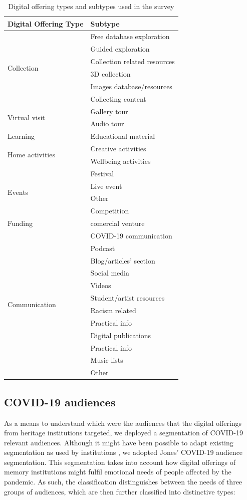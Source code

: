 \documentclass{egpubl}
\begin{document}
\begin{table}
\begin{tabular}
{ | l | l | }
    \hline
    \textbf{Digital Offering Type}  & \textbf{Subtype}  \\
    \hline
  \multirow{6}{*}{Collection} & Free database exploration  \\
&  Guided exploration  \\
&  Collection related resources \\
&  3D collection \\
&  Images database/resources \\
&  Collecting content \\
    \hline
 \multirow{2}{*}{Virtual visit} & Gallery tour  \\
&  Audio tour  \\
    \hline
 Learning & Educational material  \\
    \hline
 \multirow{2}{*}{Home activities} & Creative activities \\
&  Wellbeing activities  \\
    \hline
 \multirow{4}{*}{Events} & Festival\\
&  Live event \\
&  Other \\
&  Competition \\
    \hline
 Funding & comercial venture \\
    \hline
 \multirow{12}{*}{Communication} & COVID-19 communication \\
& Podcast \\
& Blog/articles' section \\
& Social media  \\
& Videos \\
& Student/artist resources \\
& Racism related \\
& Practical info \\
& Digital publications \\
& Practical info \\
& Music lists \\
& Other \\
    \hline
\end{tabular}
\caption{\label{tab:digoffer}Digital offering types and subtypes used in the survey}
\end{table}

\subsection{COVID-19 audiences}
\label{covaud}
As a means to understand which were the audiences that the digital offerings from heritage institutions targeted, we deployed a segmentation of COVID-19 relevant audiences. Although it might have been possible to adapt existing segmentation as used by institutions \cite{Drot19}, we adopted Jones' \cite{Audiences2020} COVID-19 audience segmentation. This segmentation takes into account how digital offerings of memory institutions might fulfil emotional needs of people affected by the pandemic. As such, the classification distinguishes between the needs of three groups of audiences, which are then further classified into distinctive types: 
\end{document}

